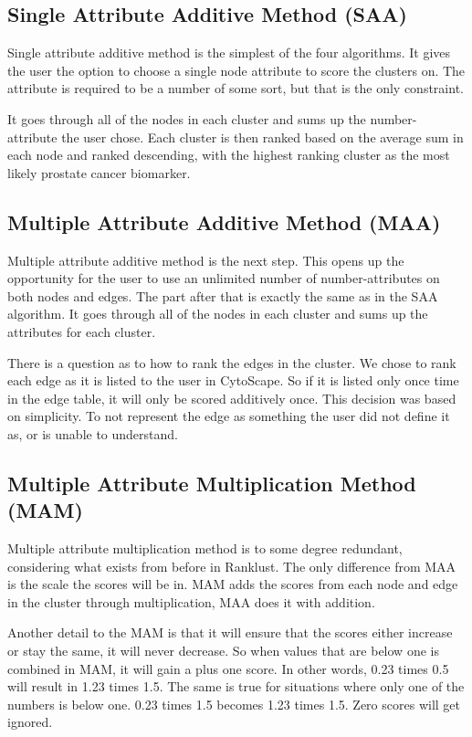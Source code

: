 \subsection{Single Attribute Additive Method (SAA)}
Single attribute additive method is the simplest of the four algorithms. It
gives the user the option to choose a single node attribute to score the
clusters on. The attribute is required to be a number of some sort, but that is
the only constraint.

It goes through all of the nodes in each cluster and sums up the number-
attribute the user chose. Each cluster is then ranked based on the average sum
in each node and ranked descending, with the highest ranking cluster as the most
likely prostate cancer biomarker.

\subsection{Multiple Attribute Additive Method (MAA)}
Multiple attribute additive method is the next step. This opens up the
opportunity for the user to use an unlimited number of number-attributes on both
nodes and edges. The part after that is exactly the same as in the SAA
algorithm. It goes through all of the nodes in each cluster and sums up the
attributes for each cluster.

There is a question as to how to rank the edges in the cluster. We chose to rank
each edge as it is listed to the user in CytoScape. So if it is listed only once
time in the edge table, it will only be scored additively once. This decision
was based on simplicity. To not represent the edge as something the user did not
define it as, or is unable to understand.

\subsection{Multiple Attribute Multiplication Method (MAM)}
Multiple attribute multiplication method is to some degree redundant,
considering what exists from before in Ranklust. The only difference from MAA is
the scale the scores will be in. MAM adds the scores from each node and edge in
the cluster through multiplication, MAA does it with addition. 

Another detail to the MAM is that it will ensure that the scores either increase
or stay the same, it will never decrease. So when values that are below one is
combined in MAM, it will gain a plus one score. In other words, 0.23 times %
0.5 will result in 1.23 times 1.5. The same is true for situations where only
one of the numbers is below one. 0.23 times 1.5 becomes 1.23 times 1.5. Zero
scores will get ignored.

